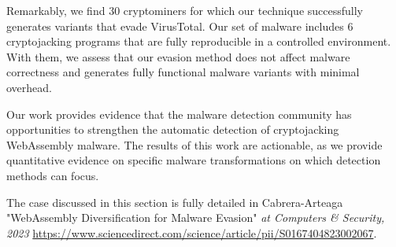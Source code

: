 Remarkably, we find 30 cryptominers for which our technique successfully generates variants that evade VirusTotal.
Our set of malware includes 6 cryptojacking programs that are fully reproducible in a controlled environment. 
With them, we assess that our evasion method does not affect malware correctness and generates fully functional malware variants with minimal overhead.

Our work provides evidence that the malware detection community has opportunities to strengthen the automatic detection of cryptojacking WebAssembly malware. 
The results of this work are actionable, as we provide quantitative evidence on specific malware transformations on which detection methods can focus.


\begin{tcolorbox}[title=Contribution paper,boxrule=1pt,arc=.2em,boxsep=1.0mm]
    The case discussed in this section is fully detailed in Cabrera-Arteaga \etal "WebAssembly Diversification for Malware Evasion"
    \emph{at Computers \& Security, 2023}
    \url{https://www.sciencedirect.com/science/article/pii/S0167404823002067}. 
\end{tcolorbox}
